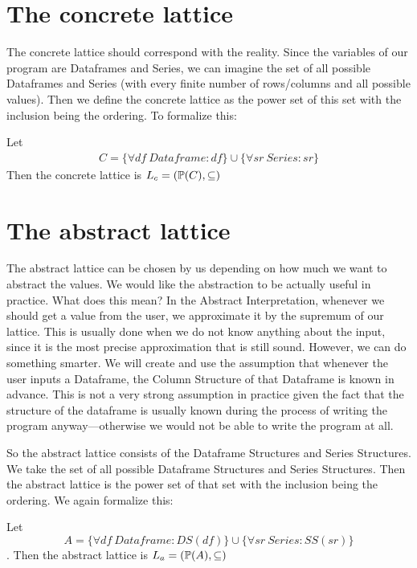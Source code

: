 \section{The concrete lattice}

The concrete lattice should correspond with the reality.
Since the variables of our program are Dataframes and Series, we can imagine the set of all possible Dataframes and
Series (with every finite number of rows/columns and all possible values).
Then we define the concrete lattice as the power set of this set with the inclusion being the ordering.
To formalize this:

\begin{defn}

    Let
    \begin{gather*}
        C = \{\forall df \: Dataframe: df\} \cup \{\forall sr \: Series: sr\}
    \end{gather*}
    Then the concrete lattice is $L_c = (\mathbb{P}(C), \subseteq)$
\end{defn}


\section{The abstract lattice}

The abstract lattice can be chosen by us depending on how much we want to abstract the values.
We would like the abstraction to be actually useful in practice.
What does this mean?
In the Abstract Interpretation, whenever we should get a value from the user, we approximate it by the supremum of our
lattice.
This is usually done when we do not know anything about the input, since it is the most precise approximation that is
still sound.
However, we can do something smarter.
We will create and use the assumption that whenever the user inputs a Dataframe, the Column Structure of that Dataframe
is known in advance.
This is not a very strong assumption in practice given the fact that the structure of the dataframe is usually known
during the process of writing the program anyway---otherwise we would not be able to write the program at all.

So the abstract lattice consists of the Dataframe Structures and Series Structures.
We take the set of all possible Dataframe Structures and Series Structures.
Then the abstract lattice is the power set of that set with the inclusion being the ordering.
We again formalize this:

\begin{defn}

    Let
    \[A = \{\forall df\: Dataframe: DS(df)\} \cup \{\forall sr \: Series: SS(sr)\}\].
    Then the abstract lattice is $L_a = (\mathbb{P}(A), \subseteq)$
\end{defn}

